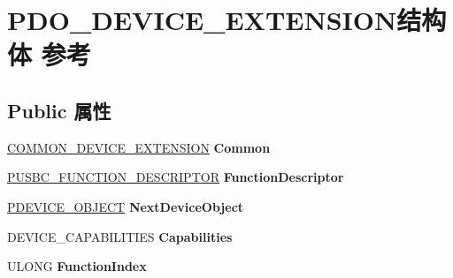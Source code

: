 \hypertarget{struct_p_d_o___d_e_v_i_c_e___e_x_t_e_n_s_i_o_n}{}\section{P\+D\+O\+\_\+\+D\+E\+V\+I\+C\+E\+\_\+\+E\+X\+T\+E\+N\+S\+I\+O\+N结构体 参考}
\label{struct_p_d_o___d_e_v_i_c_e___e_x_t_e_n_s_i_o_n}
\subsection*{Public 属性}
\begin{DoxyCompactItemize}
\item 
\mbox{\label{struct_p_d_o___d_e_v_i_c_e___e_x_t_e_n_s_i_o_n_a3c5bc12b2b4b575f36692eb1ee2118bf}} 
\hyperlink{struct_c_o_m_m_o_n___d_e_v_i_c_e___e_x_t_e_n_s_i_o_n}{C\+O\+M\+M\+O\+N\+\_\+\+D\+E\+V\+I\+C\+E\+\_\+\+E\+X\+T\+E\+N\+S\+I\+ON} {\bfseries Common}
\item 
\mbox{\label{struct_p_d_o___d_e_v_i_c_e___e_x_t_e_n_s_i_o_n_a0137cda8d0d6840378eaab108656a62b}} 
\hyperlink{struct___u_s_b_c___f_u_n_c_t_i_o_n___d_e_s_c_r_i_p_t_o_r}{P\+U\+S\+B\+C\+\_\+\+F\+U\+N\+C\+T\+I\+O\+N\+\_\+\+D\+E\+S\+C\+R\+I\+P\+T\+OR} {\bfseries Function\+Descriptor}
\item 
\mbox{\label{struct_p_d_o___d_e_v_i_c_e___e_x_t_e_n_s_i_o_n_aaa4fcd9036f29182302825fce716bf87}} 
\hyperlink{struct___d_e_v_i_c_e___o_b_j_e_c_t}{P\+D\+E\+V\+I\+C\+E\+\_\+\+O\+B\+J\+E\+CT} {\bfseries Next\+Device\+Object}
\item 
\mbox{\label{struct_p_d_o___d_e_v_i_c_e___e_x_t_e_n_s_i_o_n_a348e6c2825cb71295b90f07c01e18ede}} 
D\+E\+V\+I\+C\+E\+\_\+\+C\+A\+P\+A\+B\+I\+L\+I\+T\+I\+ES {\bfseries Capabilities}
\item 
\mbox{\label{struct_p_d_o___d_e_v_i_c_e___e_x_t_e_n_s_i_o_n_adacd65b6a2b5adab9e0a2134a9bec241}} 
U\+L\+O\+NG {\bfseries Function\+Index}
\item 
\mbox{\label{struct_p_d_o___d_e_v_i_c_e___e_x_t_e_n_s_i_o_n_a2f8272fcae13efc182d9df4185e9892e}} 

\end{DoxyCompactItemize}
